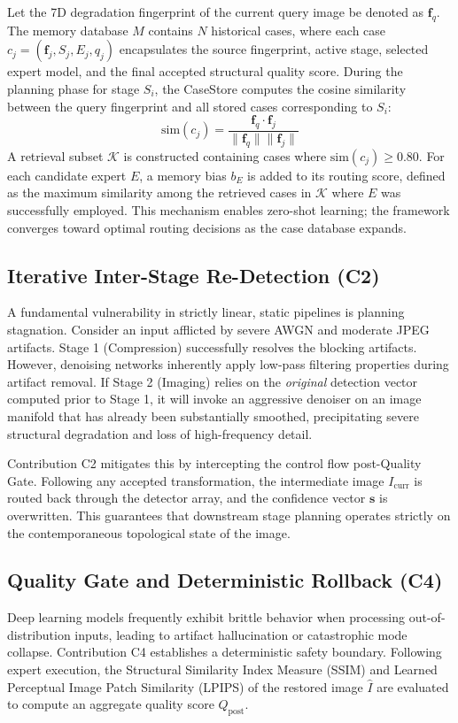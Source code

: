 \documentclass[journal, 10pt]{IEEEtran}
\begin{document}
Let the 7D degradation fingerprint of the current query image be denoted as $\mathbf{f}_q$. The memory database $M$ contains $N$ historical cases, where each case $c_j = (\mathbf{f}_j, S_j, E_j, q_j)$ encapsulates the source fingerprint, active stage, selected expert model, and the final accepted structural quality score. During the planning phase for stage $S_i$, the CaseStore computes the cosine similarity between the query fingerprint and all stored cases corresponding to $S_i$:
\begin{equation} \label{eq:cosine_sim}
    \text{sim}(c_j) = \frac{\mathbf{f}_q \cdot \mathbf{f}_j}{\|\mathbf{f}_q\| \|\mathbf{f}_j\|}
\end{equation}
A retrieval subset $\mathcal{K}$ is constructed containing cases where $\text{sim}(c_j) \geq 0.80$. For each candidate expert $E$, a memory bias $b_E$ is added to its routing score, defined as the maximum similarity among the retrieved cases in $\mathcal{K}$ where $E$ was successfully employed. This mechanism enables zero-shot learning; the framework converges toward optimal routing decisions as the case database expands.

\subsection{Iterative Inter-Stage Re-Detection (C2)}
A fundamental vulnerability in strictly linear, static pipelines is planning stagnation. Consider an input afflicted by severe AWGN and moderate JPEG artifacts. Stage 1 (Compression) successfully resolves the blocking artifacts. However, denoising networks inherently apply low-pass filtering properties during artifact removal. If Stage 2 (Imaging) relies on the \textit{original} detection vector computed prior to Stage 1, it will invoke an aggressive denoiser on an image manifold that has already been substantially smoothed, precipitating severe structural degradation and loss of high-frequency detail.

Contribution C2 mitigates this by intercepting the control flow post-Quality Gate. Following any accepted transformation, the intermediate image $I_{\text{curr}}$ is routed back through the detector array, and the confidence vector $\mathbf{s}$ is overwritten. This guarantees that downstream stage planning operates strictly on the contemporaneous topological state of the image.

\subsection{Quality Gate and Deterministic Rollback (C4)}
Deep learning models frequently exhibit brittle behavior when processing out-of-distribution inputs, leading to artifact hallucination or catastrophic mode collapse. Contribution C4 establishes a deterministic safety boundary. Following expert execution, the Structural Similarity Index Measure (SSIM) and Learned Perceptual Image Patch Similarity (LPIPS) of the restored image $\hat{I}$ are evaluated to compute an aggregate quality score $Q_{\text{post}}$.
\end{document}
